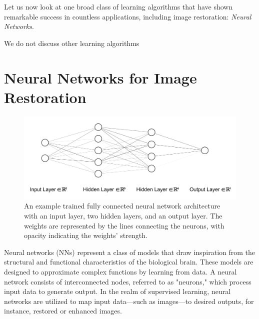 

Let us now look at one broad class of learning algorithms that have shown remarkable success in countless applications, including image restoration: \textit{Neural Networks}.

We do not discuss other learning algorithms

\section{Neural Networks for Image Restoration}

\begin{figure}[h]
    \centering
    \includegraphics[width=1\linewidth]{images/simple_nn_architecture.pdf}
    \caption{An example trained fully connected neural network architecture with an input layer, two hidden layers, and an output layer. The weights are represented by the lines connecting the neurons, with opacity indicating the weights' strength.}
    \label{fig:simple-nn-architecture}
\end{figure}
Neural networks (NNs) represent a class of models that draw inspiration from the structural and functional characteristics of the biological brain. These models are designed to approximate complex functions by learning from data. A neural network consists of interconnected nodes, referred to as "neurons," which process input data to generate output. In the realm of supervised learning, neural networks are utilized to map input data—such as images—to desired outputs, for instance, restored or enhanced images.


